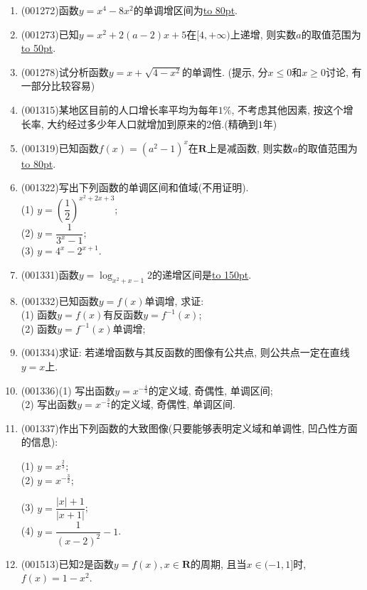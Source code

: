 \documentclass[10pt,a4paper]{article}
\newcommand{\blank}[1]{\underline{\hbox to #1pt{}}}
\begin{document}
\begin{enumerate}[1.]
(2) $y=x^2+2x+3$; \blank{80}\\ 
(3) $y=-x^2+2x+3$; \blank{80}\\ 
(4) $y=\sqrt{-x^2+2x+3}$. \blank{80}
\item {\tiny (001272)}函数$y=x^4-8x^2$的单调增区间为\blank{80}.
\item {\tiny (001273)}已知$y=x^2+2(a-2)x+5$在$[4,+\infty)$上递增, 则实数$a$的取值范围为\blank{50}.
\item {\tiny (001278)}试分析函数$y=x+\sqrt{4-x^2}$的单调性. (提示, 分$x\le0$和$x \ge 0$讨论, 有一部分比较容易)
\item {\tiny (001315)}某地区目前的人口增长率平均为每年$1\%$, 不考虑其他因素, 按这个增长率, 大约经过多少年人口就增加到原来的$2$倍.(精确到$1$年)
\item {\tiny (001319)}已知函数$f(x)=(a^2-1)^x$在$\mathbf{R}$上是减函数, 则实数$a$的取值范围为\blank{80}.
\item {\tiny (001322)}写出下列函数的单调区间和值域(不用证明).\\ 
(1) $y=\left(\dfrac{1}{2}\right)^{x^2+2x+3}$;\\ 
(2) $y=\dfrac{1}{3^x-1}$;\\ 
(3) $y=4^x-2^{x+1}$.
\item {\tiny (001331)}函数$y=\log_{x^2+x-1} 2$的递增区间是\blank{150}.
\item {\tiny (001332)}已知函数$y=f(x)$单调增, 求证:\\ 
(1) 函数$y=f(x)$有反函数$y=f^{-1}(x)$;\\ 
(2) 函数$y=f^{-1}(x)$单调增;
\item {\tiny (001334)}求证: 若递增函数与其反函数的图像有公共点, 则公共点一定在直线$y=x$上.
\item {\tiny (001336)}(1) 写出函数$y=x^{-\frac{4}{3}}$的定义域, 奇偶性, 单调区间;\\ 
(2) 写出函数$y=x^{-\frac{3}{4}}$的定义域, 奇偶性, 单调区间.
\item {\tiny (001337)}作出下列函数的大致图像(只要能够表明定义域和单调性, 凹凸性方面的信息):\\ 
\begin{multicols}{2}
(1) $y=x^{\frac{2}{3}}$; \\ 
(2) $y=x^{-\frac{3}{2}}$; \\ 
\end{multicols}
\begin{multicols}{2}
(3) $y=\dfrac{|x|+1}{|x+1|}$;  \\ 
(4) $y=\dfrac{1}{(x-2)^2}-1$.
\end{multicols}
\item {\tiny (001513)}已知$2$是函数$y=f(x),x\in\mathbf{R}$的周期, 且当$x\in(-1,1]$时, $f(x)=1-x^2$.\\ 

\end{enumerate}
\end{document}
